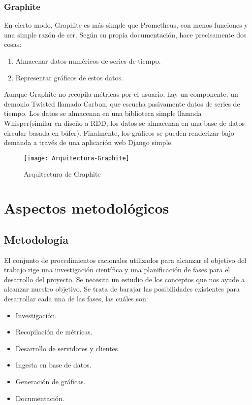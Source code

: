 \documentclass[ spanish, a4paper, 12pt, oneside]{report}
\begin{document}
\subsection{Graphite}

En cierto modo, Graphite es más simple que Prometheus, con menos funciones y una simple razón de ser. Según su propia documentación, hace precisamente dos cosas: \\

\begin{enumerate}
   \item Almacenar datos numéricos de series de tiempo.
   \item Representar gráficos de estos datos.
\end{enumerate}


Aunque Graphite no recopila métricas por el usuario, hay un componente, un demonio Twisted llamado Carbon, que escucha pasivamente datos de series 
de tiempo. Los datos se almacenan en una biblioteca simple llamada Whisper(similar en diseño a RDD, los datos se almacenan en una base de datos circular basada en búfer). Finalmente, los gráficos se pueden renderizar bajo demanda a través de una 
aplicación web Django simple. \\

\begin{figure}[!h]
   \centering
   \texttt{[image: Arquitectura-Graphite]}\\
      \caption{\label{fig: Arquitectura de Graphite} Arquitectura de Graphite}
\end{figure}

\chapter{Aspectos metodológicos}

\section{Metodología}
El conjunto de procedimientos racionales utilizados para alcanzar el objetivo del trabajo rige una investigación científica y una planificación de fases para el 
desarrollo del proyecto. Se necesita un estudio de los conceptos que nos ayude a alcanzar nuestro objetivo. Se trata de barajar las posibilidades existentes para desarrollar cada 
una de las fases, las cuáles son:

\begin{itemize}
   \item Investigación.
   \item Recopilación de métricas.
   \item Desarrollo de servidores y clientes.
   \item Ingesta en base de datos.
   \item Generación de gráficas.
   \item Documentación.
\end{itemize}
\end{document}
